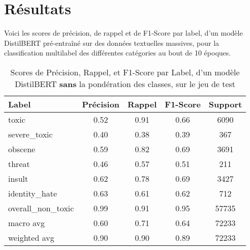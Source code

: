 \section{Résultats}

Voici les scores de précision, de rappel et de F1-Score par label, d'un modèle DistilBERT pré-entraîné sur des données textuelles massives, pour la classification multilabel des différentes catégories au bout de 10 époques.

\begin{table}[ht]
    \centering
    \caption{Scores de Précision, Rappel, et F1-Score par Label, d'un modèle DistilBERT \textbf{sans} la pondération des classes, sur le jeu de test}    \begin{tabular}{lcccc}
    \hline
    \textbf{Label} & \textbf{Précision} & \textbf{Rappel} & \textbf{F1-Score} & \textbf{Support} \\ \hline
    toxic          & 0.52               & 0.91            & 0.66              & 6090             \\
    severe\_toxic  & 0.40               & 0.38            & 0.39              & 367              \\
    obscene        & 0.59               & 0.82            & 0.69              & 3691             \\
    threat         & 0.46               & 0.57            & 0.51              & 211              \\
    insult         & 0.62               & 0.78            & 0.69              & 3427             \\
    identity\_hate & 0.63               & 0.61            & 0.62              & 712              \\
    overall\_non\_toxic & 0.99           & 0.91            & 0.95              & 57735            \\\hline
    macro avg      & 0.60              & 0.71            & 0.64              & 72233            \\
    weighted avg   & 0.90               & 0.90            & 0.89             & 72233            \\ \hline
    \end{tabular}
    \label{tab:scores}
\end{table}


